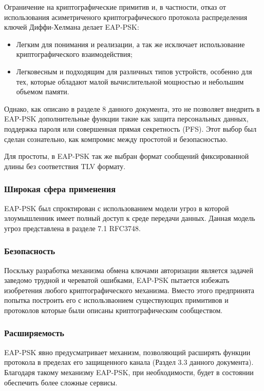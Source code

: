 Ограничение на криптографические примитив и, в частности, отказ от использования асиметриченого криптографического протокола распределения ключей Диффи-Хелмана делает EAP-PSK:
\begin{itemize}
\item Легким для понимания и реализации, а так же исключает использование криптографического взаимодействия;
\item Легковесным и подходящим для различных типов устройств, особенно для тех, которые обладают малой вычислительной мощностью и небольшим объемом памяти.
\end{itemize}

Однако, как описано в разделе 8 данного документа, это не позволяет внедрить в EAP-PSK дополнительные функции такие как защита персональных данных, поддержка пароля или совершенная прямая секретность (PFS). Этот выбор был сделан сознательно, как компромис между простотой и безопасностью.

Для простоты, в EAP-PSK так же выбран формат сообщений фиксированной длины без соответствия TLV формату.

\subsubsection{Широкая сфера применения}

EAP-PSK был спроктирован с использованием модели угроз в которой злоумышленник имеет полный доступ к среде передачи данных. Данная модель угроз представлена в разделе 7.1 RFC3748.

\subsubsection{Безопасность}

Поскльку разработка механизма обмена ключами авторизации является задачей заведомо трудной и череватой ошибками, EAP-PSK пытается избежать изобретения любого криптографического механизма. Вместо этого предпринята попытка построить его с использваонием существующих примитивов и протоколов которые были описаны криптографическим сообществом.

\subsubsection{Расширяемость}

EAP-PSK явно предусматривает механизм, позволяющий расширять функции протокола в пределах его защищенного канала (Раздел 3.3 данного документа). Благодаря такому механизму EAP-PSK, при необходимости, будет в состоянии обеспечить более сложные сервисы.

